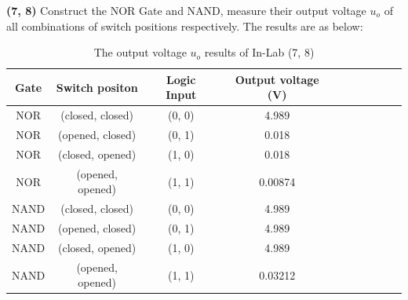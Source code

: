 \documentclass[UTF8]{report}
\theoremstyle{MyLineTheoremStyle} %
\theoremstyle{MyBlockTheoremStyle} %
\theoremstyle{MySubsubsectionStyle} %
\begin{document}
\noindent\textbf{(7, 8)}
Construct the NOR Gate and NAND, measure their output voltage $u_o$ of all combinations of switch positions respectively. The results are as below:
\begin{table}[H]\centering
    \caption{The output voltage $u_o$ results of In-Lab (7, 8)}
    \label{The output voltage results of In-Lab (7, 8)}
\begin{tabular}{cccccccccc}\toprule
    Gate & Switch positon &  Logic Input & Output voltage (V) \\
    \midrule
    NOR  & (closed, closed) & (0, 0) & 4.989\\
    NOR  & (opened, closed) & (0, 1) & 0.018\\
    NOR  & (closed, opened) & (1, 0) & 0.018\\
    NOR  & (opened, opened) & (1, 1) & 0.00874\\
    NAND & (closed, closed) & (0, 0) & 4.989\\
    NAND & (opened, closed) & (0, 1) & 4.989\\
    NAND & (closed, opened) & (1, 0) & 4.989\\
    NAND & (opened, opened) & (1, 1) & 0.03212\\
    \bottomrule
\end{tabular}
\end{table}
\end{document}
